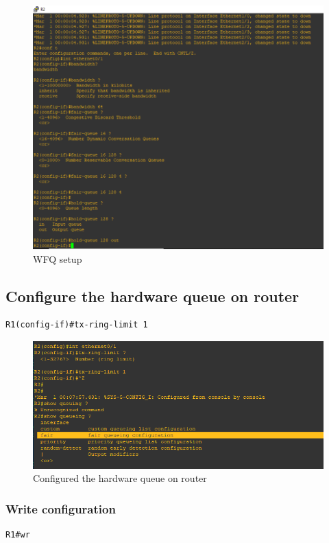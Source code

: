 \documentclass[paper=letter, fontsize=12pt]{article}
\begin{document}
\begin{figure}[H]
	\setlength{\parindent}{-5em} 
	\includegraphics[width=550px]{refs/1}
	\caption{WFQ setup}
\end{figure}

\subsection{Configure the hardware queue on router}
\begin{verbatim}
R1(config-if)#tx-ring-limit 1
\end{verbatim}

\begin{figure}[H]
	\includegraphics[width=450px]{refs/hardware}
	\caption{Configured the hardware queue on router}
\end{figure}

\subsubsection{Write configuration}
\begin{verbatim}
R1#wr
\end{verbatim}
\end{document}
